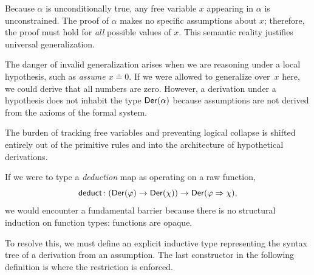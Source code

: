 Because $\alpha$ is unconditionally true, any free variable $x$ appearing in $\alpha$ is unconstrained. The proof of $\alpha$ makes no specific assumptions about $x$; therefore, the proof must hold for \textit{all} possible values of $x$. This semantic reality justifies universal generalization.

The danger of invalid generalization arises when we are reasoning under a local hypothesis, such as \textit{assume $x\doteq0$}. If we were allowed to generalize over~$x$ here, we could derive that all numbers are zero. However, a derivation under a hypothesis does not inhabit the type $\mathsf{Der}(\alpha)$ because assumptions are not derived from the axioms of the formal system.

The burden of tracking free variables and preventing logical collapse is shifted entirely out of the primitive rules and into the architecture of hypothetical derivations.

If we were to type a \textit{deduction} map as operating on a raw function,
\[
    \fun{deduct}\colon(
        \fun{Der}(\varphi)\to\fun{Der}(\chi)
    )
    \to
    \fun{Der}(\varphi\imp\chi),
\]
we would encounter a fundamental barrier because there is no structural induction on function types: functions are opaque.

To resolve this, we must define an explicit inductive type representing the syntax tree of a derivation from an assumption. The last constructor in the following definition is where the restriction is enforced.

